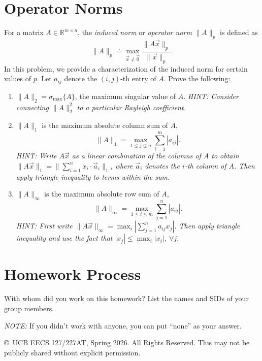 \documentclass[10pt]{article}
\theoremstyle{definition}
\theoremstyle{plain}
\newcommand{\RR}{\mathbb{R}}
\begin{document}
\newpage

\section{Operator Norms}

For a matrix $A \in \RR^{m \times n}$, the \textit{induced norm} or \textit{operator norm} $\|A\|_p$ is defined as
\begin{equation}
\|A\|_p \doteq \max_{\vec{x} \neq \vec{0}} \frac{\|A\vec{x}\|_p}{\|\vec{x}\|_p}.
\end{equation}
In this problem, we provide a characterization of the induced norm for certain values of $p$. Let $a_{ij}$ denote the $(i,j)$-th entry of $A$. Prove the following:

\begin{enumerate}[label=(\alph*)]
\item $\|A\|_2 = \sigma_{\max}\{A\}$, the maximum singular value of $A$. \textit{HINT: Consider connecting $\|A\|_2^2$ to a particular Rayleigh coefficient.}

\item $\|A\|_1$ is the maximum absolute column sum of $A$,
\begin{equation}
\|A\|_1 = \max_{1 \le j \le n} \sum_{i=1}^{m} |a_{ij}|.
\end{equation}
\textit{HINT: Write $A\vec{x}$ as a linear combination of the columns of $A$ to obtain $\|A\vec{x}\|_1 = \|\sum_{i=1}^{n} x_i \cdot \vec{a}_i\|_1$, where $\vec{a}_i$ denotes the $i$-th column of $A$. Then apply triangle inequality to terms within the sum.}

\item $\|A\|_\infty$ is the maximum absolute row sum of $A$,
\begin{equation}
\|A\|_\infty = \max_{1 \le i \le m} \sum_{j=1}^{n} |a_{ij}|.
\end{equation}
\textit{HINT: First write $\|A\vec{x}\|_\infty = \max_i \left|\sum_{j=1}^{n} a_{ij} x_j\right|$. Then apply triangle inequality and use the fact that $|x_j| \le \max_i |x_i|$, $\forall j$.}
\end{enumerate}

\newpage

\section{Homework Process}

With whom did you work on this homework? List the names and SIDs of your group members.

\textit{NOTE:} If you didn't work with anyone, you can put ``none'' as your answer.

\vfill
\begin{center}
\small \copyright\ UCB EECS 127/227AT, Spring 2026. All Rights Reserved. This may not be publicly shared without explicit permission.
\end{center}
\end{document}
